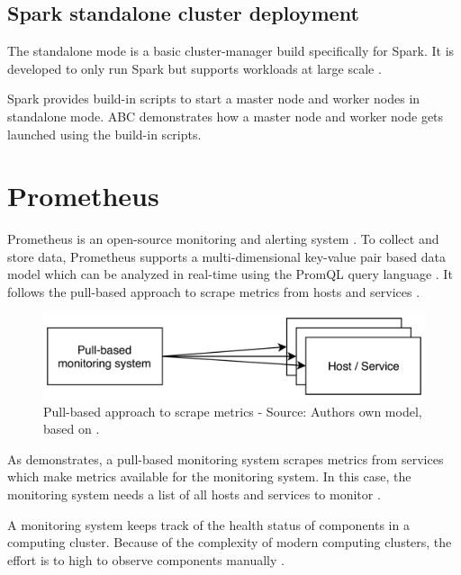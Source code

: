 \subsection{Spark standalone cluster deployment}
The standalone mode is a basic cluster-manager build specifically for Spark. It is developed to only run Spark but supports workloads at large scale \cite{Chambers2018Spark}.

Spark provides build-in scripts to start a master node and worker nodes in standalone mode. ABC demonstrates how a master node and worker node gets launched using the build-in scripts.


\section{Prometheus}
Prometheus is an open-source monitoring and alerting system \cite{Prom2020Docs}.
To collect and store data, Prometheus supports a multi-dimensional key-value pair based data model which can be analyzed in real-time using the PromQL query language \cite{Pandey2020Monitoring}.
It follows the pull-based approach to scrape metrics from hosts and services \cite{Bastos2019Prom}.

\begin{figure}[h]%
\centering
\includegraphics[scale=0.25]{images/03_background/prom_pull-based}%
\caption{Pull-based approach to scrape metrics - Source: Authors own model, based on \cite{Bastos2019Prom}.}%
\label{fig:prom_pull-based}%
\end{figure}

As  demonstrates, a pull-based monitoring system scrapes metrics from services which make metrics available for the monitoring system. In this case, the monitoring system needs a list of all hosts and services to monitor \cite{Bastos2019Prom}.


A monitoring system keeps track of the health status of components in a computing cluster. Because of the complexity of modern computing clusters, the effort is to high to observe components manually \cite{Bastos2019Prom}.


